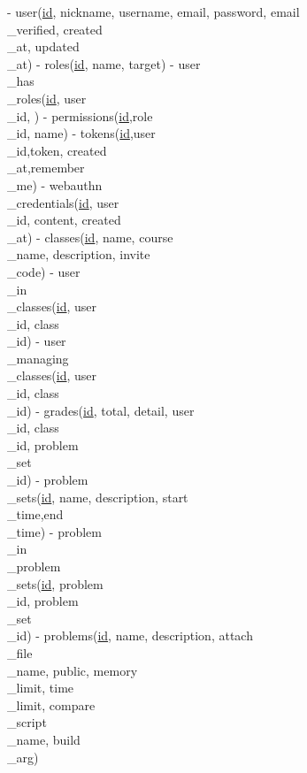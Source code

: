 \documentclass{ctexart}
\begin{document}
\begin{markdown}
- user(\underline{id}, nickname, username, email, password, email\\\_verified, created\\\_at, updated\\\_at)
- roles(\underline{id}, name, target)
- user\\\_has\\\_roles(\underline{id}, user\\\_id, )
- permissions(\underline{id},role\\\_id, name)
- tokens(\underline{id},user\\\_id,token, created\\\_at,remember\\\_me)
- webauthn\\\_credentials(\underline{id}, user\\\_id, content, created\\\_at)
- classes(\underline{id}, name, course\\\_name, description, invite\\\_code)
- user\\\_in\\\_classes(\underline{id}, user\\\_id, class\\\_id)
- user\\\_managing\\\_classes(\underline{id}, user\\\_id, class\\\_id)
- grades(\underline{id}, total, detail, user\\\_id, class\\\_id, problem\\\_set\\\_id)
- problem\\\_sets(\underline{id}, name, description, start\\\_time,end\\\_time)
- problem\\\_in\\\_problem\\\_sets(\underline{id}, problem\\\_id, problem\\\_set\\\_id)
- problems(\underline{id}, name, description, attach\\\_file\\\_name, public, memory\\\_limit, time\\\_limit, compare\\\_script\\\_name, build\\\_arg)


\end{markdown}
\end{document}

